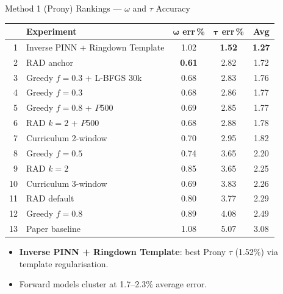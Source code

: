 \documentclass[aspectratio=169, 11pt]{beamer}
\begin{document}
\begin{frame}{Method 1 (Prony) Rankings --- $\omega$ and $\tau$ Accuracy}
  \begin{center}
    \scriptsize
    \begin{tabular}{@{}rlccc@{}}
      \toprule
      & \textbf{Experiment}
        & $\boldsymbol{\omega}$ \textbf{err\,\%}
        & $\boldsymbol{\tau}$ \textbf{err\,\%}
        & \textbf{Avg} \\
      \midrule
      \rowcolor{green!10}
      1  & Inverse PINN + Ringdown Template      & 1.02         & \textbf{1.52} & \textbf{1.27} \\
      2  & RAD anchor                       & \textbf{0.61} & 2.82          & 1.72 \\
      3  & Greedy $f\!=\!0.3$ + L-BFGS 30k & 0.68          & 2.83          & 1.76 \\
      4  & Greedy $f\!=\!0.3$               & 0.68          & 2.86          & 1.77 \\
      5  & Greedy $f\!=\!0.8$ + $P$500      & 0.69          & 2.85          & 1.77 \\
      6  & RAD $k\!=\!2$ + $P$500           & 0.68          & 2.88          & 1.78 \\
      7  & Curriculum 2-window              & 0.70          & 2.95          & 1.82 \\
      8  & Greedy $f\!=\!0.5$               & 0.74          & 3.65          & 2.20 \\
      9  & RAD $k\!=\!2$                    & 0.85          & 3.65          & 2.25 \\
      10 & Curriculum 3-window              & 0.69          & 3.83          & 2.26 \\
      11 & RAD default                      & 0.80          & 3.77          & 2.29 \\
      12 & Greedy $f\!=\!0.8$               & 0.89          & 4.08          & 2.49 \\
      \rowcolor{red!5}
      13 & Paper baseline                   & 1.08          & 5.07          & 3.08 \\
      \bottomrule
    \end{tabular}
  \end{center}

  \smallskip
  \begin{itemize}\small
    \item \textbf{Inverse PINN + Ringdown Template}: best Prony $\tau$ (1.52\%) via template regularisation.
    \item Forward models cluster at 1.7--2.3\% average error.
  \end{itemize}
\end{frame}
\end{document}

